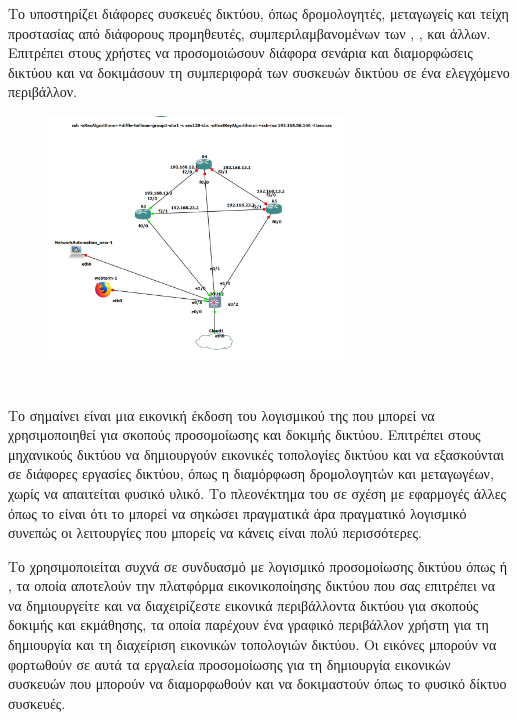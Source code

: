 Το  υποστηρίζει διάφορες συσκευές δικτύου, όπως δρομολογητές, μεταγωγείς και τείχη προστασίας 
από διάφορους προμηθευτές, συμπεριλαμβανομένων των , ,  και άλλων. Επιτρέπει στους χρήστες να 
προσομοιώσουν διάφορα σενάρια και διαμορφώσεις δικτύου και να δοκιμάσουν τη συμπεριφορά των 
συσκευών δικτύου σε ένα ελεγχόμενο περιβάλλον. 

\begin{figure}[htb]
	\centering
	\includegraphics[width=0.7\textwidth]{graphics/Network_topology.png}
	\caption{ }
\end{figure}



\section{}
Το  σημαίνει  είναι μια εικονική έκδοση του λογισμικού  της  που 
μπορεί να χρησιμοποιηθεί για σκοπούς προσομοίωσης και δοκιμής δικτύου. Επιτρέπει στους μηχανικούς δικτύου να δημιουργούν εικονικές τοπολογίες δικτύου και να εξασκούνται σε διάφορες εργασίες δικτύου, 
όπως η διαμόρφωση δρομολογητών και μεταγωγέων, χωρίς να απαιτείται φυσικό υλικό. Το πλεονέκτημα του  σε σχέση με εφαρμογές άλλες όπως το  είναι ότι το  
μπορεί να σηκώσει πραγματικά  άρα πραγματικό λογισμικό συνεπώς οι λειτουργίες που μπορείς να κάνεις είναι πολύ περισσότερες.

Το  χρησιμοποιείται συχνά σε συνδυασμό με λογισμικό προσομοίωσης δικτύου όπως 
 ή , τα οποία αποτελούν την πλατφόρμα εικονικοποίησης δικτύου που σας επιτρέπει να 
να δημιουργείτε και να διαχειρίζεστε εικονικά περιβάλλοντα δικτύου για σκοπούς δοκιμής και εκμάθησης, τα οποία παρέχουν ένα γραφικό περιβάλλον χρήστη για τη δημιουργία και τη διαχείριση εικονικών 
τοπολογιών δικτύου. Οι εικόνες  μπορούν να φορτωθούν σε αυτά τα εργαλεία προσομοίωσης για τη δημιουργία εικονικών συσκευών  που μπορούν να διαμορφωθούν και να δοκιμαστούν όπως το φυσικό δίκτυο 
συσκευές.

